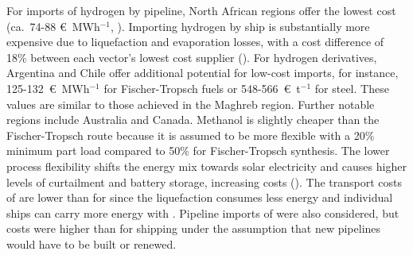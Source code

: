For imports of hydrogen by pipeline, North African regions offer the lowest cost
(ca.~74-88 \euro{}~MWh$^{-1}$, ). Importing hydrogen
by ship is substantially more expensive due to liquefaction and evaporation
losses, with a cost difference of 18\% between each vector's lowest cost
supplier (). For hydrogen derivatives, Argentina and
Chile offer additional potential for low-cost imports, for instance,
125-132~\euro{}~MWh$^{-1}$ for Fischer-Tropsch fuels or 548-566~\euro{}~t$^{-1}$
for steel. These values are similar to those achieved in the Maghreb region.
Further notable regions include Australia and Canada. Methanol is slightly cheaper
than the Fischer-Tropsch route because it is assumed to be more flexible with a
20\% minimum part load compared to 50\% for Fischer-Tropsch
synthesis.\cite{brownUltralongdurationEnergyStorage2023} The lower process
flexibility shifts the energy mix towards solar electricity and causes higher
levels of curtailment and battery storage, increasing costs
(). The transport costs of  are lower
than for  since the liquefaction consumes less energy and individual
ships can carry more energy with . Pipeline imports of 
were also considered, but costs were higher than for  shipping under
the assumption that new pipelines would have to be built or renewed.

\begin{figure}
\end{figure}

